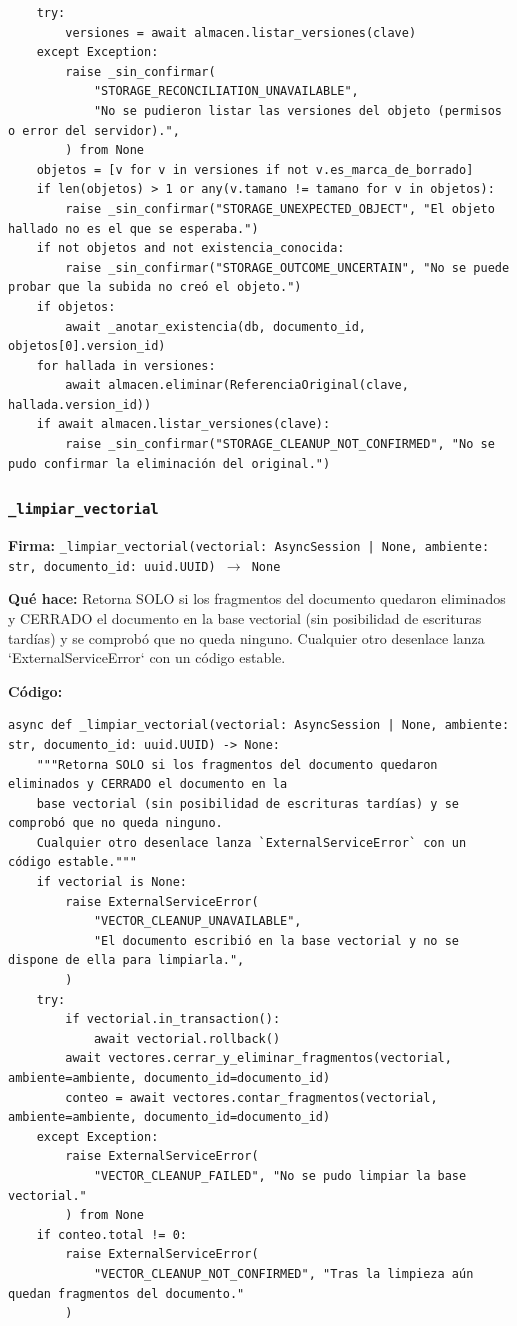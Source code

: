 \documentclass[11pt,a4paper]{article}
\begin{document}
\begin{lstlisting}
    try:
        versiones = await almacen.listar_versiones(clave)
    except Exception:
        raise _sin_confirmar(
            "STORAGE_RECONCILIATION_UNAVAILABLE",
            "No se pudieron listar las versiones del objeto (permisos o error del servidor).",
        ) from None
    objetos = [v for v in versiones if not v.es_marca_de_borrado]
    if len(objetos) > 1 or any(v.tamano != tamano for v in objetos):
        raise _sin_confirmar("STORAGE_UNEXPECTED_OBJECT", "El objeto hallado no es el que se esperaba.")
    if not objetos and not existencia_conocida:
        raise _sin_confirmar("STORAGE_OUTCOME_UNCERTAIN", "No se puede probar que la subida no creó el objeto.")
    if objetos:
        await _anotar_existencia(db, documento_id, objetos[0].version_id)
    for hallada in versiones:
        await almacen.eliminar(ReferenciaOriginal(clave, hallada.version_id))
    if await almacen.listar_versiones(clave):
        raise _sin_confirmar("STORAGE_CLEANUP_NOT_CONFIRMED", "No se pudo confirmar la eliminación del original.")
\end{lstlisting}

\subsubsection*{\texttt{\_limpiar\_vectorial}}
\textbf{Firma:} \texttt{\_limpiar\_vectorial(vectorial: AsyncSession | None, ambiente: str, documento\_id: uuid.UUID) $\rightarrow$ None}

\textbf{Qué hace:} Retorna SOLO si los fragmentos del documento quedaron eliminados y CERRADO el documento en la
base vectorial (sin posibilidad de escrituras tardías) y se comprobó que no queda ninguno.
Cualquier otro desenlace lanza `ExternalServiceError` con un código estable.

\textbf{Código:}
\begin{lstlisting}
async def _limpiar_vectorial(vectorial: AsyncSession | None, ambiente: str, documento_id: uuid.UUID) -> None:
    """Retorna SOLO si los fragmentos del documento quedaron eliminados y CERRADO el documento en la
    base vectorial (sin posibilidad de escrituras tardías) y se comprobó que no queda ninguno.
    Cualquier otro desenlace lanza `ExternalServiceError` con un código estable."""
    if vectorial is None:
        raise ExternalServiceError(
            "VECTOR_CLEANUP_UNAVAILABLE",
            "El documento escribió en la base vectorial y no se dispone de ella para limpiarla.",
        )
    try:
        if vectorial.in_transaction():
            await vectorial.rollback()
        await vectores.cerrar_y_eliminar_fragmentos(vectorial, ambiente=ambiente, documento_id=documento_id)
        conteo = await vectores.contar_fragmentos(vectorial, ambiente=ambiente, documento_id=documento_id)
    except Exception:
        raise ExternalServiceError(
            "VECTOR_CLEANUP_FAILED", "No se pudo limpiar la base vectorial."
        ) from None
    if conteo.total != 0:
        raise ExternalServiceError(
            "VECTOR_CLEANUP_NOT_CONFIRMED", "Tras la limpieza aún quedan fragmentos del documento."
        )
\end{lstlisting}
\end{document}
